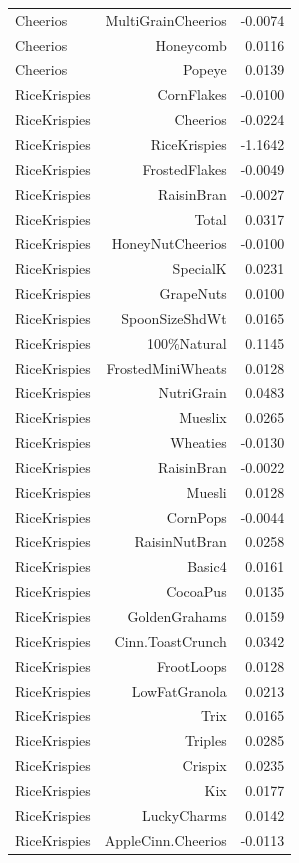 \begin{longtable}{@{}lrr@{}}
Cheerios & MultiGrainCheerios & -0.0074 \\
Cheerios & Honeycomb & 0.0116 \\
Cheerios & Popeye & 0.0139 \\
RiceKrispies & CornFlakes & -0.0100 \\
RiceKrispies & Cheerios & -0.0224 \\
RiceKrispies & RiceKrispies & -1.1642 \\
RiceKrispies & FrostedFlakes & -0.0049 \\
RiceKrispies & RaisinBran & -0.0027 \\
RiceKrispies & Total & 0.0317 \\
RiceKrispies & HoneyNutCheerios & -0.0100 \\
RiceKrispies & SpecialK & 0.0231 \\
RiceKrispies & GrapeNuts & 0.0100 \\
RiceKrispies & SpoonSizeShdWt & 0.0165 \\
RiceKrispies & 100\%Natural & 0.1145 \\
RiceKrispies & FrostedMiniWheats & 0.0128 \\
RiceKrispies & NutriGrain & 0.0483 \\
RiceKrispies & Mueslix & 0.0265 \\
RiceKrispies & Wheaties & -0.0130 \\
RiceKrispies & RaisinBran & -0.0022 \\
RiceKrispies & Muesli & 0.0128 \\
RiceKrispies & CornPops & -0.0044 \\
RiceKrispies & RaisinNutBran & 0.0258 \\
RiceKrispies & Basic4 & 0.0161 \\
RiceKrispies & CocoaPus & 0.0135 \\
RiceKrispies & GoldenGrahams & 0.0159 \\
RiceKrispies & Cinn.ToastCrunch & 0.0342 \\
RiceKrispies & FrootLoops & 0.0128 \\
RiceKrispies & LowFatGranola & 0.0213 \\
RiceKrispies & Trix & 0.0165 \\
RiceKrispies & Triples & 0.0285 \\
RiceKrispies & Crispix & 0.0235 \\
RiceKrispies & Kix & 0.0177 \\
RiceKrispies & LuckyCharms & 0.0142 \\
RiceKrispies & AppleCinn.Cheerios & -0.0113 \\

\end{longtable}
